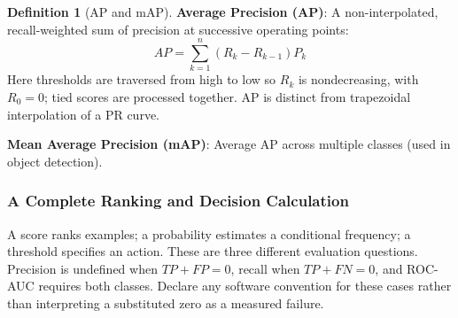 \documentclass[11pt,twoside]{article}
\numberwithin{equation}{section}
\theoremstyle{plain}
\theoremstyle{definition}
\newtheorem{definition}[theorem]{Definition}
\theoremstyle{remark}
\begin{document}
\begin{definition}[AP and mAP]
\textbf{Average Precision (AP)}: A non-interpolated, recall-weighted sum of precision at successive operating points:
\[
AP = \sum_{k=1}^n (R_k - R_{k-1}) P_k
\]
Here thresholds are traversed from high to low so $R_k$ is nondecreasing, with $R_0=0$; tied scores are processed together. AP is distinct from trapezoidal interpolation of a PR curve.

\textbf{Mean Average Precision (mAP)}: Average AP across multiple classes (used in object detection).
\end{definition}

\subsubsection{A Complete Ranking and Decision Calculation}
\label{sec:finite-metrics}
A score ranks examples; a probability estimates a conditional frequency; a
threshold specifies an action. These are three different evaluation questions.
Precision is undefined when $TP+FP=0$, recall when $TP+FN=0$, and ROC-AUC
requires both classes. Declare any software convention for these cases rather
than interpreting a substituted zero as a measured failure.
\end{document}
